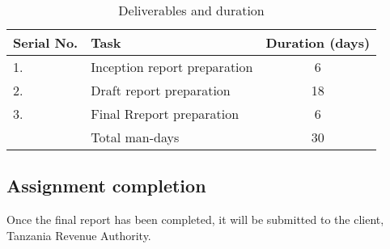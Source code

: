 \documentclass[12pt,a4paper,final]{article}
\begin{document}
\begin{table}[h]
\centering
\caption{Deliverables and duration}
\begin{tabular}{|l|l|c|}
\hline Serial No.  & Task   & Duration (days)  \\ 
\hline 1.  & Inception report preparation & 6 \\ 
\hline 2.  & Draft report preparation & 18 \\ 
\hline 3. & Final Rreport preparation & 6 \\ 
\hline  & Total man-days  & 30 \\ 
\hline 
\end{tabular} 
\end{table}

\subsection{Assignment completion}
Once the final report has been completed, it will be submitted to the client, Tanzania Revenue Authority.
\end{document}
